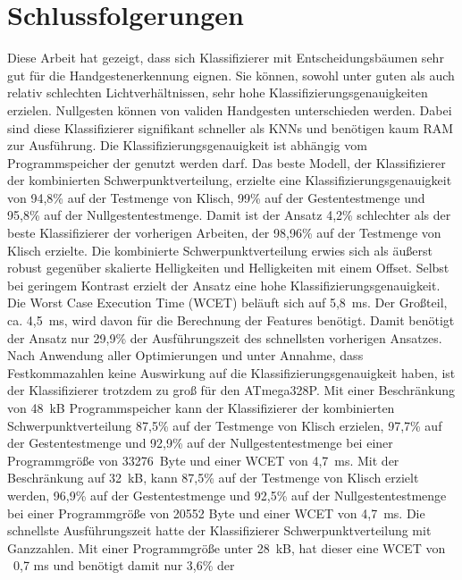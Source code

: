 \chapter{Schlussfolgerungen}
Diese Arbeit hat gezeigt, dass sich Klassifizierer mit Entscheidungsbäumen sehr gut für die Handgestenerkennung eignen. Sie können, sowohl unter guten als auch
relativ schlechten Lichtverhältnissen, sehr hohe Klassifizierungsgenauigkeiten erzielen. Nullgesten können von validen Handgesten unterschieden werden. Dabei sind diese Klassifizierer signifikant
schneller als KNNs und benötigen kaum RAM zur Ausführung. Die Klassifizierungsgenauigkeit ist abhängig vom Programmspeicher der genutzt werden darf.
\newline
\newline
Das beste Modell, der Klassifizierer der kombinierten Schwerpunktverteilung, erzielte eine Klassifizierungsgenauigkeit von 94,8\% auf der Testmenge von Klisch, 99\% auf der Gestentestmenge und 95,8\% auf der Nullgestentestmenge. Damit
ist der Ansatz 4,2\% schlechter als der beste Klassifizierer der vorherigen Arbeiten, der 98,96\% auf der Testmenge von Klisch erzielte. Die kombinierte Schwerpunktverteilung erwies sich als
äußerst robust gegenüber skalierte Helligkeiten und Helligkeiten mit einem Offset. Selbst bei geringem Kontrast erzielt der Ansatz eine hohe Klassifizierungsgenauigkeit. Die Worst Case Execution Time (WCET) beläuft
sich auf 5,8~ms. Der Großteil, ca. 4,5~ms, wird davon für die Berechnung der Features benötigt. Damit benötigt der Ansatz nur 29,9\% der Ausführungszeit des schnellsten vorherigen Ansatzes.
Nach Anwendung aller Optimierungen und unter Annahme, dass Festkommazahlen keine Auswirkung auf die Klassifizierungsgenauigkeit haben, ist der Klassifizierer trotzdem zu groß für den ATmega328P.
\newline
\newline
Mit einer Beschränkung von 48~kB Programmspeicher kann der Klassifizierer der kombinierten Schwerpunktverteilung 87,5\% auf der Testmenge von Klisch erzielen, 97,7\% auf
der Gestentestmenge und 92,9\% auf der Nullgestentestmenge bei einer Programmgröße von 33276~Byte und einer WCET von 4,7~ms. Mit der Beschränkung auf 32~kB, kann 87,5\% auf der
Testmenge von Klisch erzielt werden, 96,9\% auf der Gestentestmenge und 92,5\% auf der Nullgestentestmenge bei einer Programmgröße von 20552 Byte und einer WCET von 4,7~ms.
\newline
\newline
Die schnellste Ausführungszeit hatte der Klassifizierer Schwerpunktverteilung mit Ganzzahlen. Mit einer Programmgröße unter 28~kB, hat dieser eine WCET von ~0,7 ms und benötigt damit nur 3,6\% der

